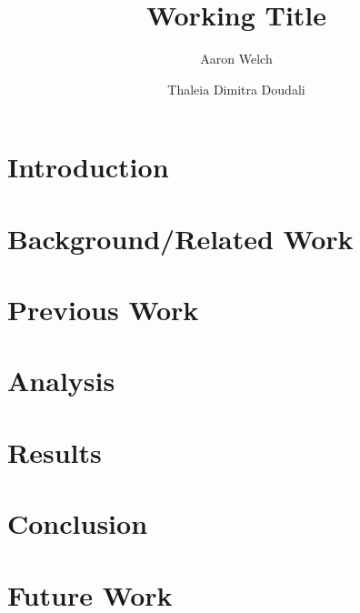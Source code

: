 \documentclass[runningheads]{llncs}
\begin{document}
\title{Working Title}
\author{Aaron Welch \and  Thaleia Dimitra Doudali}

\maketitle
\begin{abstract}

\end{abstract}
\section{Introduction}
\label{sec:intro}

\section{Background/Related Work}
\label{sec:background}

\section{Previous Work}
\label{sec:prevwork}

\section{Analysis}
\label{sec:analysis}

\section{Results}
\label{sec:results}

\section{Conclusion}
\label{sec:conclusion}

\section{Future Work}
\label{sec:future}



\end{document}
